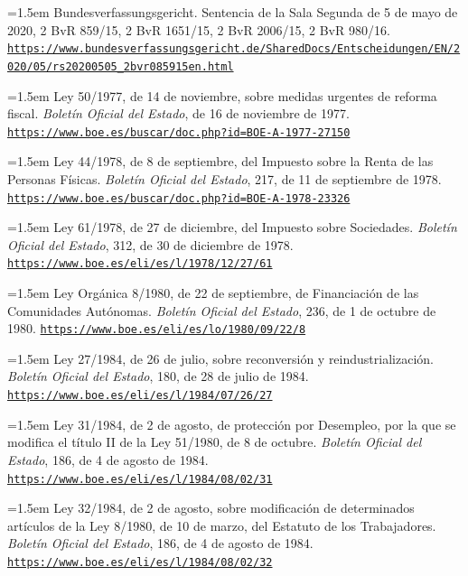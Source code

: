\documentclass[10pt,a4paper]{article}
\begin{document}
\noindent\hangindent=1.5em Bundesverfassungsgericht. Sentencia de la Sala Segunda de 5 de mayo de 2020, 2 BvR 859/15, 2 BvR 1651/15, 2 BvR 2006/15, 2 BvR 980/16. \href{https://www.bundesverfassungsgericht.de/SharedDocs/Entscheidungen/EN/2020/05/rs20200505_2bvr085915en.html}{\nolinkurl{https://www.bundesverfassungsgericht.de/SharedDocs/Entscheidungen/EN/2020/05/rs20200505_2bvr085915en.html}}

\noindent\hangindent=1.5em Ley 50/1977, de 14 de noviembre, sobre medidas urgentes de reforma fiscal. \textit{Boletín Oficial del Estado}, de 16 de noviembre de 1977. \href{https://www.boe.es/buscar/doc.php?id=BOE-A-1977-27150}{\nolinkurl{https://www.boe.es/buscar/doc.php?id=BOE-A-1977-27150}}

\noindent\hangindent=1.5em Ley 44/1978, de 8 de septiembre, del Impuesto sobre la Renta de las Personas Físicas. \textit{Boletín Oficial del Estado}, 217, de 11 de septiembre de 1978. \href{https://www.boe.es/buscar/doc.php?id=BOE-A-1978-23326}{\nolinkurl{https://www.boe.es/buscar/doc.php?id=BOE-A-1978-23326}}

\noindent\hangindent=1.5em Ley 61/1978, de 27 de diciembre, del Impuesto sobre Sociedades. \textit{Boletín Oficial del Estado}, 312, de 30 de diciembre de 1978. \href{https://www.boe.es/eli/es/l/1978/12/27/61}{\nolinkurl{https://www.boe.es/eli/es/l/1978/12/27/61}}

\noindent\hangindent=1.5em Ley Orgánica 8/1980, de 22 de septiembre, de Financiación de las Comunidades Autónomas. \textit{Boletín Oficial del Estado}, 236, de 1 de octubre de 1980. \href{https://www.boe.es/eli/es/lo/1980/09/22/8}{\nolinkurl{https://www.boe.es/eli/es/lo/1980/09/22/8}}

\noindent\hangindent=1.5em Ley 27/1984, de 26 de julio, sobre reconversión y reindustrialización. \textit{Boletín Oficial del Estado}, 180, de 28 de julio de 1984. \href{https://www.boe.es/eli/es/l/1984/07/26/27}{\nolinkurl{https://www.boe.es/eli/es/l/1984/07/26/27}}

\noindent\hangindent=1.5em Ley 31/1984, de 2 de agosto, de protección por Desempleo, por la que se modifica el título II de la Ley 51/1980, de 8 de octubre. \textit{Boletín Oficial del Estado}, 186, de 4 de agosto de 1984. \href{https://www.boe.es/eli/es/l/1984/08/02/31}{\nolinkurl{https://www.boe.es/eli/es/l/1984/08/02/31}}

\noindent\hangindent=1.5em Ley 32/1984, de 2 de agosto, sobre modificación de determinados artículos de la Ley 8/1980, de 10 de marzo, del Estatuto de los Trabajadores. \textit{Boletín Oficial del Estado}, 186, de 4 de agosto de 1984. \href{https://www.boe.es/eli/es/l/1984/08/02/32}{\nolinkurl{https://www.boe.es/eli/es/l/1984/08/02/32}}
\end{document}
